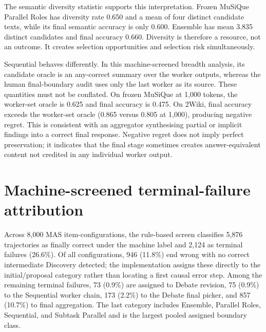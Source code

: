 The semantic diversity statistic supports this interpretation. Frozen MuSiQue Parallel Roles has diversity rate 0.650 and a mean of four distinct candidate texts, while its final semantic accuracy is only 0.600. Ensemble has mean 3.835 distinct candidates and final accuracy 0.660. Diversity is therefore a resource, not an outcome. It creates selection opportunities and selection risk simultaneously.

Sequential behaves differently. In this machine-screened breadth analysis, its candidate oracle is an any-correct summary over the worker outputs, whereas the human final-boundary audit uses only the last worker as its source. These quantities must not be conflated. On frozen MuSiQue at 1,000 tokens, the worker-set oracle is 0.625 and final accuracy is 0.475. On 2Wiki, final accuracy exceeds the worker-set oracle (0.865 versus 0.805 at 1,000), producing negative regret. This is consistent with an aggregator synthesising partial or implicit findings into a correct final response. Negative regret does not imply perfect preservation; it indicates that the final stage sometimes creates answer-equivalent content not credited in any individual worker output.

\section{Machine-screened terminal-failure attribution}

Across 8,000 MAS item-configurations, the rule-based screen classifies 5,876 trajectories as finally correct under the machine label and 2,124 as terminal failures (26.6\%). Of all configurations, 946 (11.8\%) end wrong with no correct intermediate Discovery detected; the implementation assigns these directly to the initial/proposal category rather than locating a first causal error step. Among the remaining terminal failures, 73 (0.9\%) are assigned to Debate revision, 75 (0.9\%) to the Sequential worker chain, 173 (2.2\%) to the Debate final picker, and 857 (10.7\%) to final aggregation. The last category includes Ensemble, Parallel Roles, Sequential, and Subtask Parallel and is the largest pooled assigned boundary class.

